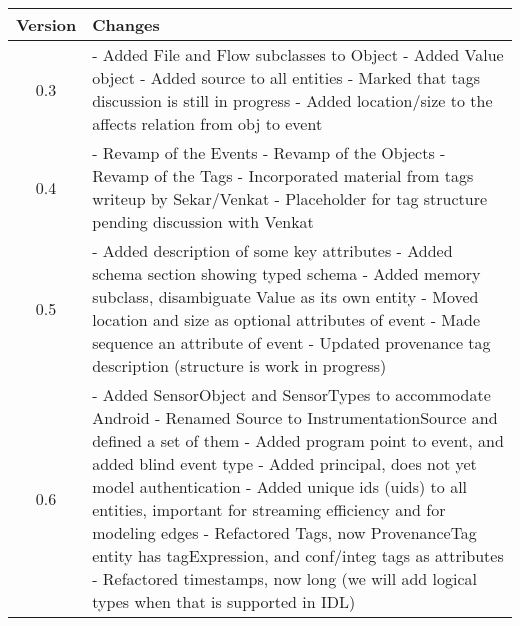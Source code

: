 \documentclass[10pt, conference, onecolumn]{IEEEtran}
\begin{document}
\begin{longtable}{|c|p{17cm}|}
\hline
Version & Changes \\\hline
0.3 & \small
  - Added File and Flow subclasses to Object \newline  
  - Added Value object \newline
  - Added source to all entities \newline
  - Marked that tags discussion is still in progress \newline
  - Added location/size to the affects relation from obj to event
\\\hline
0.4 & \small
  - Revamp of the Events \newline
  - Revamp of the Objects \newline
  - Revamp of the Tags \newline
  - Incorporated material from tags writeup by Sekar/Venkat \newline
  - Placeholder for tag structure pending discussion with Venkat          
\\\hline
0.5 & \small 
  - Added description of some key attributes \newline
  - Added schema section showing typed schema \newline
  - Added memory subclass, disambiguate Value as its own entity \newline 
  - Moved location and size as optional attributes of event \newline
  - Made sequence an attribute of event \newline
  - Updated provenance tag description (structure is work in progress)
\\\hline
0.6 &  \small
  - Added SensorObject and SensorTypes to accommodate Android  \newline
  - Renamed Source to InstrumentationSource and defined a set of them  \newline
  - Added program point to event, and added blind event type  \newline
  - Added principal, does not yet model authentication  \newline
  - Added unique ids (uids) to all entities, important for streaming efficiency and for modeling edges  \newline
  - Refactored Tags, now ProvenanceTag entity has tagExpression, and conf/integ tags as attributes  \newline
  - Refactored timestamps, now long (we will add logical types when that is supported in IDL)  \newline

\end{longtable}
\end{document}
